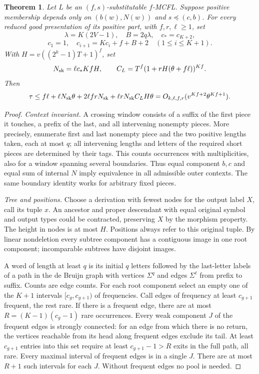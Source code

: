\documentclass[11pt]{article}
\newtheorem{theorem}{Theorem}
\begin{document}
\begin{theorem}
Let $L$ be an $(f,s)$-substitutable $f$-MCFL. Suppose positive membership
depends only on $(b(w),N(w))$ and $s\preceq(c,b)$. For every reduced good
presentation of its positive part, with $f,r,\ell\ge1$, set
\[
 \lambda=K(2V-1),\quad B=2q\lambda,\quad c_*=c_{K+2},
\]
\[
 c_1=1,\quad c_{i+1}=Kc_i+f+B+2\quad(1\le i\le K+1).
\]
With $H=v((2^k-1)T+1)^f$, set
\[
 N_{\rm sk}=\ell c_*KfH,\qquad C_L=T^f(1+rH(\theta+f\ell))^{Kf}.
\]
Then
\[
 \tau\le f\ell+\ell N_{\rm sk}\theta+2\ell frN_{\rm sk}
             +\ell rN_{\rm sk} C_L H\theta
 =O_{k,\ell,f,r}(v^{Kf+2}\theta^{Kf+1}).
\]
\end{theorem}
\begin{proof}
\emph{Context invariant.}
A crossing window consists of a suffix of the first piece it touches,
a prefix of the last, and all intervening nonempty pieces. More precisely,
enumerate first and last nonempty piece and the two positive lengths taken,
each at most $q$; all intervening lengths and letters of the required
short pieces are determined by their tags. This counts occurrences with
multiplicities, also for a window spanning several boundaries. Thus equal
component $b,c$ and equal sum of internal $N$ imply equivalence in all
admissible outer contexts. The same boundary identity works for arbitrary
fixed pieces.

\emph{Tree and positions.}
Choose a derivation with fewest nodes for the output label $X$, call its
tuple $x$. An ancestor and proper descendant with equal original symbol
and output types could be contracted, preserving $X$ by the morphism property.
The height in nodes is at most $H$. Positions always refer to this original
tuple. By linear nondeletion every subtree component has a contiguous image
in one root component; incomparable subtrees have disjoint images.

A word of length at least $q$ is its initial $q$ letters followed by the
last-letter labels of a path in the de Bruijn graph with vertices $\Sigma^q$
and edges $\Sigma^\ell$ from prefix to suffix. Counts are edge counts. For each
root component select an empty one of the $K+1$ intervals $[c_g,c_{g+1})$
of frequencies. Call edges of frequency at least $c_{g+1}$ frequent,
the rest rare. If there is a frequent edge, there are at most
$R=(K-1)(c_g-1)$ rare occurrences. Every weak component $J$ of the
frequent edges is strongly connected: for an edge from which there is no
return, the vertices reachable from its head along frequent edges exclude
its tail. At least $c_{g+1}$ entries into this set require at least
$c_{g+1}-1>R$ exits in the full path, all rare. Every maximal interval
of frequent edges is in a single $J$. There are at most $R+1$ such
intervals for each $J$. Without frequent edges no pool is needed.


\end{proof}
\end{document}
